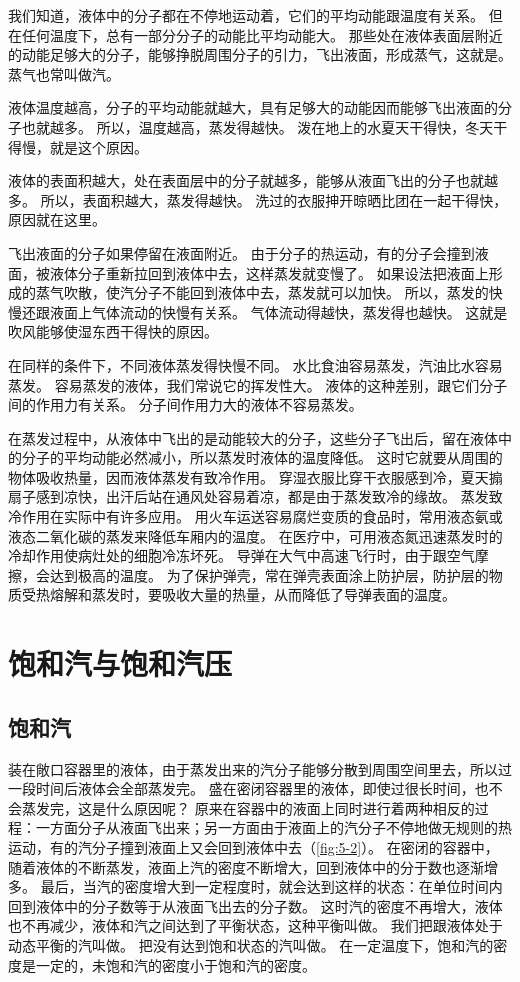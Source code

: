 我们知道，液体中的分子都在不停地运动着，它们的平均动能跟温度有关系。
但在任何温度下，总有一部分分子的动能比平均动能大。
那些处在液体表面层附近的动能足够大的分子，能够挣脱周围分子的引力，飞出液面，形成蒸气，这就是。
蒸气也常叫做汽。

液体温度越高，分子的平均动能就越大，具有足够大的动能因而能够飞出液面的分子也就越多。
所以，温度越高，蒸发得越快。
泼在地上的水夏天干得快，冬天干得慢，就是这个原因。

液体的表面积越大，处在表面层中的分子就越多，能够从液面飞出的分子也就越多。
所以，表面积越大，蒸发得越快。
洗过的衣服抻开晾晒比团在一起干得快，原因就在这里。

飞出液面的分子如果停留在液面附近。
由于分子的热运动，有的分子会撞到液面，被液体分子重新拉回到液体中去，这样蒸发就变慢了。
如果设法把液面上形成的蒸气吹散，使汽分子不能回到液体中去，蒸发就可以加快。
所以，蒸发的快慢还跟液面上气体流动的快慢有关系。
气体流动得越快，蒸发得也越快。
这就是吹风能够使湿东西干得快的原因。

在同样的条件下，不同液体蒸发得快慢不同。
水比食油容易蒸发，汽油比水容易蒸发。
容易蒸发的液体，我们常说它的挥发性大。
液体的这种差别，跟它们分子间的作用力有关系。
分子间作用力大的液体不容易蒸发。

在蒸发过程中，从液体中飞出的是动能较大的分子，这些分子飞出后，留在液体中的分子的平均动能必然减小，所以蒸发时液体的温度降低。
这时它就要从周围的物体吸收热量，因而液体蒸发有致冷作用。
穿湿衣服比穿干衣服感到冷，夏天搧扇子感到凉快，出汗后站在通风处容易着凉，都是由于蒸发致冷的缘故。
蒸发致冷作用在实际中有许多应用。
用火车运送容易腐烂变质的食品时，常用液态氨或液态二氧化碳的蒸发来降低车厢内的温度。
在医疗中，可用液态氮迅速蒸发时的冷却作用使病灶处的细胞冷冻坏死。
导弹在大气中高速飞行时，由于跟空气摩擦，会达到极高的温度。
为了保护弹壳，常在弹壳表面涂上防护层，防护层的物质受热熔解和蒸发时，要吸收大量的热量，从而降低了导弹表面的温度。

\section{饱和汽与饱和汽压}
\subsection{饱和汽} 
装在敞口容器里的液体，由于蒸发出来的汽分子能够分散到周围空间里去，所以过一段时间后液体会全部蒸发完。
盛在密闭容器里的液体，即使过很长时间，也不会蒸发完，这是什么原因呢？
原来在容器中的液面上同时进行着两种相反的过程：一方面分子从液面飞出来；另一方面由于液面上的汽分子不停地做无规则的热运动，有的汽分子撞到液面上又会回到液体中去（\cref{fig:5-2}）。
在密闭的容器中，随着液体的不断蒸发，液面上汽的密度不断增大，回到液体中的分于数也逐渐增多。
最后，当汽的密度增大到一定程度时，就会达到这样的状态：在单位时间内回到液体中的分子数等于从液面飞出去的分子数。
这时汽的密度不再增大，液体也不再减少，液体和汽之间达到了平衡状态，这种平衡叫做。
我们把跟液体处于动态平衡的汽叫做。
把没有达到饱和状态的汽叫做。
在一定温度下，饱和汽的密度是一定的，未饱和汽的密度小于饱和汽的密度。

